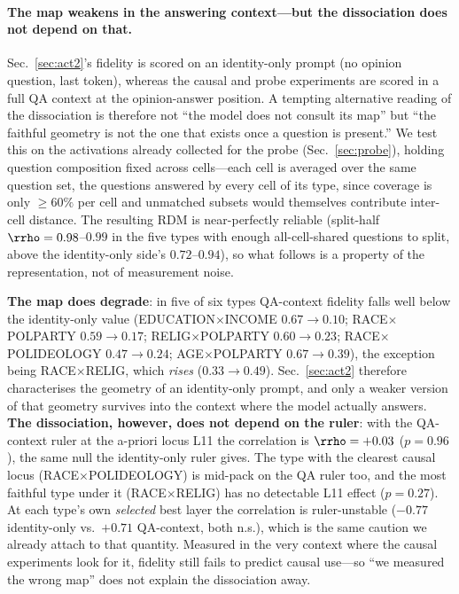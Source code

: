 \paragraph{The map weakens in the answering context---but the
dissociation does not depend on that.} Sec.~\ref{sec:act2}'s fidelity
is scored on an identity-only prompt (no opinion question, last token),
whereas the causal and probe experiments are scored in a full QA
context at the opinion-answer position. A tempting alternative reading
of the dissociation is therefore not ``the model does not consult its
map'' but ``the faithful geometry is not the one that exists once a
question is present.'' We test this on the activations already
collected for the probe (Sec.~\ref{sec:probe}), holding question
composition fixed across cells---each cell is averaged over the same
question set, the questions answered by every cell of its type, since
coverage is only ${\ge}60\%$ per cell and unmatched subsets would
themselves contribute inter-cell distance. The resulting RDM is
near-perfectly reliable (split-half $\rrho=0.98$--$0.99$ in the five
types with enough all-cell-shared questions to split, above the
identity-only side's $0.72$--$0.94$), so what follows is a property of
the representation, not of measurement noise.

\textbf{The map does degrade}: in five of six types QA-context fidelity falls well below the
identity-only value (EDUCATION$\times$INCOME $0.67\to0.10$;
RACE$\times$POLPARTY $0.59\to0.17$; RELIG$\times$POLPARTY
$0.60\to0.23$; RACE$\times$POLIDEOLOGY $0.47\to0.24$;
AGE$\times$POLPARTY $0.67\to0.39$), the exception being
RACE$\times$RELIG, which \emph{rises} ($0.33\to0.49$).
Sec.~\ref{sec:act2} therefore characterises the geometry of an
identity-only prompt, and only a weaker version of that geometry
survives into the context where the model actually answers.
\textbf{The dissociation, however, does not depend on the ruler}: with
the QA-context ruler at the a-priori locus L11 the correlation is
$\rrho=+0.03$ ($p=0.96$), the same null the identity-only ruler gives.
The type with the clearest causal locus (RACE$\times$POLIDEOLOGY) is
mid-pack on the QA ruler too, and the most faithful type under it
(RACE$\times$RELIG) has no detectable L11 effect ($p=0.27$). At each
type's own \emph{selected} best layer the correlation is ruler-unstable
($-0.77$ identity-only vs.\ $+0.71$ QA-context, both n.s.), which is
the same caution we already attach to that quantity. Measured in the
very context where the causal experiments look for it, fidelity still
fails to predict causal use---so ``we measured the wrong map'' does not
explain the dissociation away.

